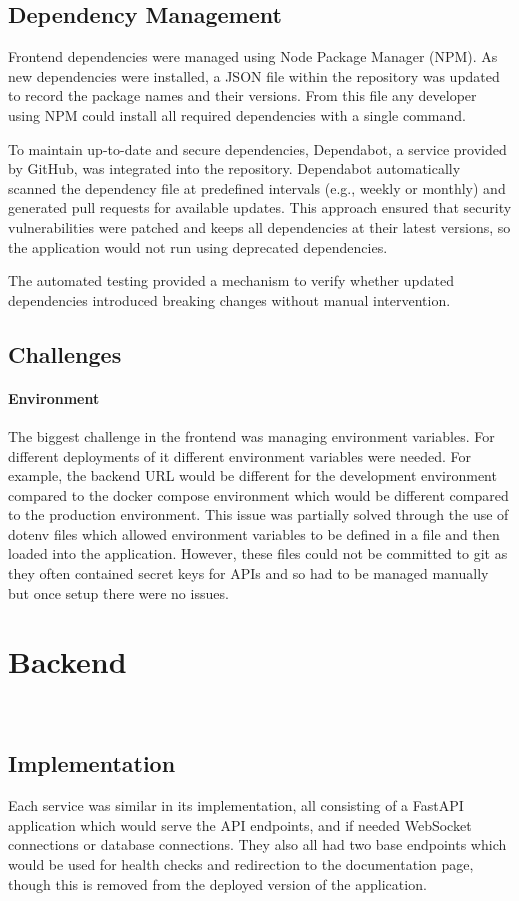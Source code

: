 \subsection{Dependency Management}
Frontend dependencies were managed using Node Package Manager (NPM). As new dependencies were installed, a JSON file within the repository was updated to record the package names and their versions. From this file any developer using NPM could install all required dependencies with a single command.

To maintain up-to-date and secure dependencies, Dependabot, a service provided by GitHub, was integrated into the repository. Dependabot automatically scanned the dependency file at predefined intervals (e.g., weekly or monthly) and generated pull requests for available updates. This approach ensured that security vulnerabilities were patched and keeps all dependencies at their latest versions, so the application would not run using deprecated dependencies.

The automated testing provided a mechanism to verify whether updated dependencies introduced breaking changes without manual intervention.

\subsection{Challenges}
\paragraph{Environment}
The biggest challenge in the frontend was managing environment variables. For different deployments of it different environment variables were needed. For example, the backend URL would be different for the development environment compared to the docker compose environment which would be different compared to the production environment. This issue was partially solved through the use of dotenv files which allowed environment variables to be defined in a file and then loaded into the application. However, these files could not be committed to git as they often contained secret keys for APIs and so had to be managed manually but once setup there were no issues.

\section{Backend}~\label{sec:backend-development}
\subsection{Implementation}
Each service was similar in its implementation, all consisting of a FastAPI application which would serve the API endpoints, and if needed WebSocket connections or database connections. They also all had two base endpoints which would be used for health checks and redirection to the documentation page, though this is removed from the deployed version of the application.

